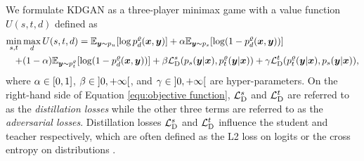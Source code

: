 \documentclass{article}
\newcommand{\OVEC}[1]{\bm{#1}} %
\newcommand{\LOSS}[2]{\mathcal{#1}_{\rm{#2}}} %
\newcommand{\EXP}{\mathbb{E}} %
\newcommand{\DTN}{\mathcal{L}_{\rm{D}}}
\newcommand{\kdganfullobj}{U(s,t,d)}
\newcommand{\kdganmin}{\min_{s,t}}
\newcommand{\kdganmax}{\max_{d}}
\newcommand{\stddistloss}{\LOSS{L}{D}^{s}}
\newcommand{\tchdistloss}{\LOSS{L}{D}^{t}}
\newcommand{\abbrpdat}{p_{u}}
\newcommand{\fullpdat}{p_{u}(\OVEC{y}|\OVEC{x})}
\newcommand{\abbrpstd}{p_{s}}
\newcommand{\fullpstd}[1]{p_{s}(#1|\OVEC{x})}
\newcommand{\abbrptch}{p_{t}^{\varrho}}
\newcommand{\fullptch}[1]{p_{t}^{\varrho}(#1|\OVEC{x})}
\newcommand{\fullpdis}[1]{p_{d}^{\varrho}(\OVEC{x},#1)}
\begin{document}
We formulate KDGAN as a three-player minimax game with a value function $\kdganfullobj$ defined as
\begin{equation} \label{equ:objective function}
\hspace*{-0.01cm}
\begin{aligned}
\kdganmin
\kdganmax
\kdganfullobj
=
\EXP_{\OVEC{y}\sim\abbrpdat}[\log\fullpdis{\OVEC{y}}]
&
+
\alpha\EXP_{\OVEC{y}\sim\abbrpstd}[\log(1-\fullpdis{\OVEC{y}})]
\\
+
(1-\alpha)
\EXP_{\OVEC{y}\sim\abbrptch}[\log(1-\fullpdis{\OVEC{y}})]
+
\beta
&
\stddistloss(\fullpstd{\OVEC{y}},\fullptch{\OVEC{y}})
+
\gamma
\tchdistloss(\fullptch{\OVEC{y}},\fullpstd{\OVEC{y}})
\text{,}
\\
\end{aligned}
\end{equation}%
where $\alpha\in\interval{0}{1}$, $\beta\in\interval[open left, open right]{0}{+\infty}$, and $\gamma\in\interval[open left, open right]{0}{+\infty}$ are hyper-parameters.
On the right-hand side of Equation \ref{equ:objective function}, $\stddistloss$ and $\tchdistloss$ are referred to as the \emph{distillation losses} while the other three terms are referred to as the \emph{adversarial losses}.
Distillation losses $\stddistloss$ and $\tchdistloss$ influence the student and teacher respectively, which are often defined as the L2 loss on logits \cite{ba2014deep} or the cross entropy on distributions \cite{hinton2015distilling}.
\end{document}
